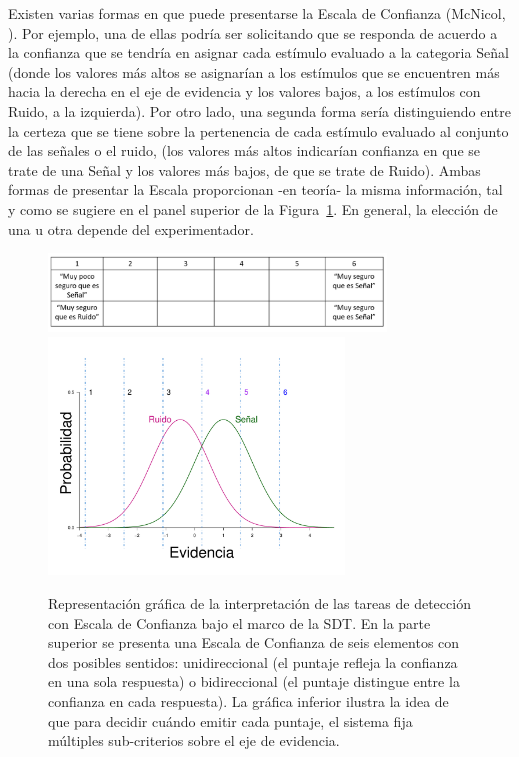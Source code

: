 \begin{itemize}
Existen varias formas en que puede presentarse la Escala de Confianza (McNicol, \citeyear{McNicol2}). Por ejemplo, una de ellas podría ser solicitando que se responda de acuerdo a la confianza que se tendría en asignar cada estímulo evaluado a la categoria Señal (donde los valores más altos se asignarían a los estímulos que se encuentren más hacia la derecha en el eje de evidencia y los valores bajos, a los estímulos con Ruido, a la izquierda). Por otro lado, una segunda forma sería distinguiendo entre la certeza que se tiene sobre la pertenencia de cada estímulo evaluado al conjunto de las señales o el ruido, (los valores más altos indicarían confianza en que se trate de una Señal y los valores más bajos, de que se trate de Ruido). Ambas formas de presentar la Escala proporcionan -en teoría- la misma información, tal y como se sugiere en el panel superior de la Figura~\ref{fig:Conf_Rat}. En general, la elección de una u otra depende del experimentador.\\

\begin{figure}[h]
\centering
\includegraphics[width=0.8\textwidth]{Figures/Puntajes_Criterios}\\
\includegraphics[width=0.70\textwidth]{Figures/ConfidenceRating}\\
\caption[Tareas de detección con Escala de Confianza y su interpretación]{Representación gráfica de la interpretación de las tareas de detección con Escala de Confianza bajo el marco de la SDT. En la parte superior se presenta una Escala de Confianza de seis elementos con dos posibles sentidos: unidireccional (el puntaje refleja la confianza en una sola respuesta) o bidireccional (el puntaje distingue entre la confianza en cada respuesta). La gráfica inferior ilustra la idea de que para decidir cuándo emitir cada puntaje, el sistema fija múltiples sub-criterios sobre el eje de evidencia.}
\label{fig:Conf_Rat}
\end{figure}


\end{itemize}
